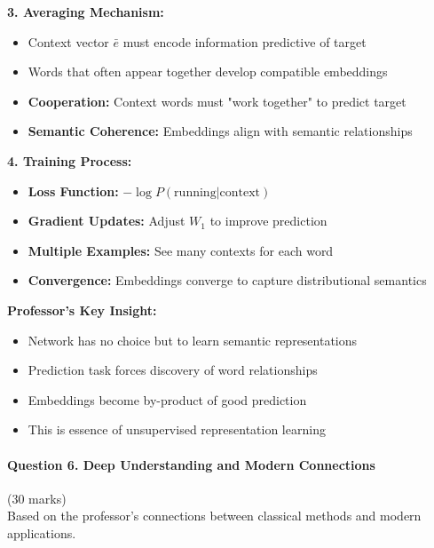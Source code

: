 \documentclass[12pt]{article}
\begin{document}
\begin{enumerate}[(a)]
{    \textbf{3. Averaging Mechanism:}
    \begin{itemize}
        \item Context vector $\bar{e}$ must encode information predictive of target
        \item Words that often appear together develop compatible embeddings
        \item \textbf{Cooperation:} Context words must "work together" to predict target
        \item \textbf{Semantic Coherence:} Embeddings align with semantic relationships
    \end{itemize}
    
    \textbf{4. Training Process:}
    \begin{itemize}
        \item \textbf{Loss Function:} $-\log P(\text{running} | \text{context})$
        \item \textbf{Gradient Updates:} Adjust $W_1$ to improve prediction
        \item \textbf{Multiple Examples:} See many contexts for each word
        \item \textbf{Convergence:} Embeddings converge to capture distributional semantics
    \end{itemize}
    
    \textbf{Professor's Key Insight:}
    \begin{itemize}
        \item Network has no choice but to learn semantic representations
        \item Prediction task forces discovery of word relationships
        \item Embeddings become by-product of good prediction
        \item This is essence of unsupervised representation learning
    \end{itemize}
    }
\end{enumerate}

\newpage
\paragraph{Question 6. Deep Understanding and Modern Connections}\hfill (30 marks)\\
Based on the professor's connections between classical methods and modern applications.
\end{document}
